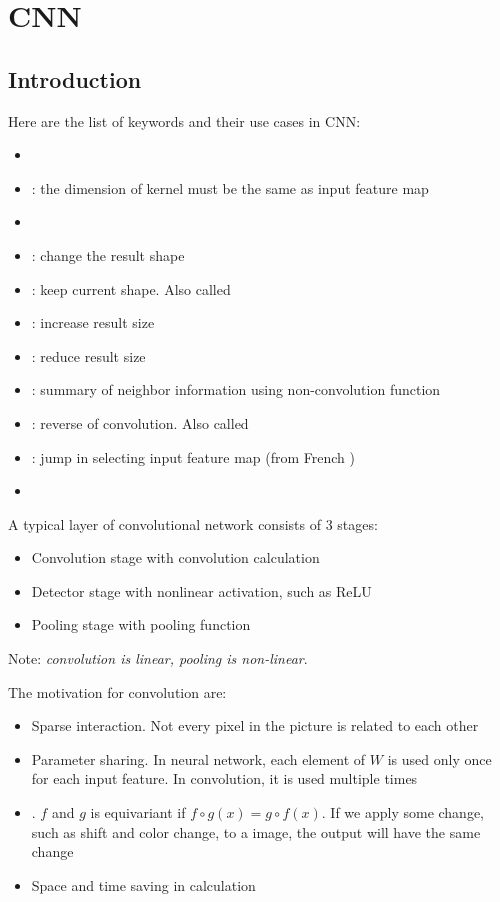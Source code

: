 \chapter{CNN}

\section{Introduction}

Here are the list of keywords and their use cases in CNN:
    \begin{itemize}
        \item {}
        \item {}: the dimension of kernel must be the same as input feature map
        \item {}
        \item {}: change the result shape
        \item {}: keep current shape. Also called 
        \item {}: increase result size
        \item {}: reduce result size
        \item {}: summary of neighbor information using non-convolution function
        \item {}: reverse of convolution. Also called 
        \item {}: jump in selecting input feature map (from French )
        \item {}
    \end{itemize}


A typical layer of convolutional network consists of 3 stages:
\begin{itemize}
    \item Convolution stage with convolution calculation
    \item Detector stage with nonlinear activation, such as ReLU
    \item Pooling stage with pooling function
\end{itemize}

Note: \emph{convolution is linear, pooling is non-linear}.


The motivation for convolution are:
\begin{itemize}
    \item Sparse interaction. Not every pixel in the picture is related to each other
    \item Parameter sharing. In neural network, each element of $W$ is used only once for each input feature. In convolution, it is used multiple times
    \item {}. $f$ and $g$ is equivariant if $f \circ g(x) = g \circ f(x)$. If we apply some change, such as shift and color change, to a image, the output will have the same change
    \item Space and time saving in calculation
\end{itemize}


